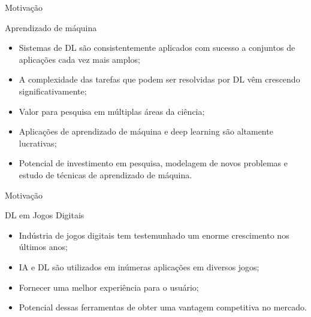 \documentclass[aspectratio=169]{beamer}
\begin{document}
\begin{frame}{Motivação}

\begin{block}{\large{{Aprendizado de máquina}}}
	\begin{itemize}
		\item Sistemas de DL são consistentemente aplicados com sucesso a conjuntos de aplicações cada vez mais amplos;
		\item A complexidade das tarefas que podem ser resolvidas por DL vêm crescendo significativamente;
		\item Valor para pesquisa em múltiplas áreas da ciência;
		\item Aplicações de aprendizado de máquina e deep learning são altamente lucrativas;
		\item Potencial de investimento em pesquisa, modelagem de novos problemas e estudo de técnicas de aprendizado de máquina.
	\end{itemize}
\end{block}

\end{frame}
\begin{frame}{Motivação}

\begin{block}{\large{{DL em Jogos Digitais}}}
	\begin{itemize}
		\item Indústria de jogos digitais tem testemunhado um enorme crescimento nos últimos anos;
		\item IA e DL são utilizados em inúmeras aplicações em diversos jogos;
		\item Fornecer uma melhor experiência para o usuário;
		\item Potencial dessas ferramentas de obter uma vantagem competitiva no mercado.
	\end{itemize}
\end{block}

\end{frame}
\end{document}

